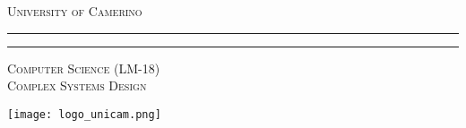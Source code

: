 \begin{titlepage}



\begin{center}
{{\Large{\textsc{University of Camerino}}}}
\rule[0.1cm]{15.8cm}{0.1mm}
\rule[0.5cm]{15.8cm}{0.5mm}
{\textsc{Computer Science (LM-18)}} \\
{\textsc{Complex Systems Design}}

\titolo

\vspace{1cm}
\begin{figure*}[h]
	\centering
   	\texttt{[image: logo\_unicam.png]}
\end{figure*}

%

\end{center}
\vfill
\autori
\vspace{0.5cm}

\anno
\end{titlepage}

